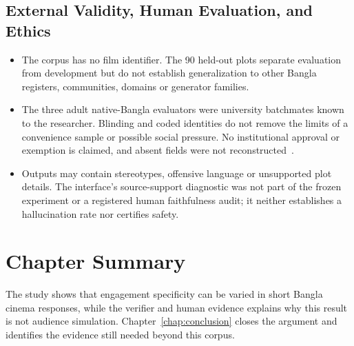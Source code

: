 \subsection{External Validity, Human Evaluation, and Ethics}
\label{sec:ch7-external-human-ethical}

\begin{itemize}
    \setlength{\itemsep}{2pt}
    \setlength{\parskip}{0pt}
    \setlength{\parsep}{0pt}
    \item The corpus has no film identifier. The 90 held-out plots separate evaluation from development but do not establish generalization to other Bangla registers, communities, domains or generator families.
    \item The three adult native-Bangla evaluators were university batchmates known to the researcher. Blinding and coded identities do not remove the limits of a convenience sample or possible social pressure. No institutional approval or exemption is claimed, and absent fields were not reconstructed~\citep{b32}.
    \item Outputs may contain stereotypes, offensive language or unsupported plot details. The interface's source-support diagnostic was not part of the frozen experiment or a registered human faithfulness audit; it neither establishes a hallucination rate nor certifies safety.
\end{itemize}

\section{Chapter Summary}
\label{sec:ch7-summary}

The study shows that engagement specificity can be varied in short Bangla cinema responses, while the verifier and human evidence explains why this result is not audience simulation. Chapter~\ref{chap:conclusion} closes the argument and identifies the evidence still needed beyond this corpus.
